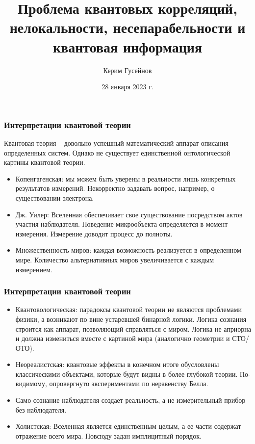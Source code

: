\documentclass[10pt]{beamer}
\title[Проблемы квантовой физики]{%
  Проблема квантовых корреляций, нелокальности, несепарабельности %
  и квантовая информация
}
\author{Керим Гусейнов}
\institute[МГУ]{Московский государственный университет имени М.\,В.~Ломоносова}
\date{28 января 2023 г.}
\begin{document}
\frame[plain]{\titlepage}

\begin{frame}[label=interpretations-1]%
  \frametitle{Интерпретации квантовой теории}

  Квантовая теория -- довольно успешный математический аппарат описания 
  определенных систем. Однако не существует единственной онтологической 
  картины квантовой теории.

  \begin{itemize}
    \item Копенгагенская: мы можем быть уверены в реальности лишь 
      конкретных результатов измерений. Некорректно задавать вопрос, 
      например, о существовании электрона.

    \item Дж. Уилер: Вселенная обеспечивает свое существование 
      посредством актов участия наблюдателя. Поведение микрообъекта 
      определяется в момент измерения. Измерение доводит процесс до 
      полноты.

    \item Множественность миров: каждая возможность реализуется 
      в определенном мире. Количество альтернативных миров увеличивается 
      с каждым измерением.
  \end{itemize}
\end{frame}%

\begin{frame}[label=interpretations-2]%
  \frametitle{Интерпретации квантовой теории}

  \begin{itemize}
    \item Квантовологическая: парадоксы квантовой теории не являются 
      проблемами физики, а возникают по вине устаревшей бинарной логики. 
      Логика сознания строится как аппарат, позволяющий справляться 
      с миром. Логика не априорна и должна измениться вместе с картиной 
      мира (аналогично геометрии и СТО/ОТО).

    \item Неореалистская: квантовые эффекты в конечном итоге обусловлены 
      классическими объектами, которые будут видны в более глубокой 
      теории. По-видимому, опровергнуто экспериментами по неравенству 
      Белла.

    \item Само сознание наблюдателя создает реальность, а не 
      измерительный прибор без наблюдателя.

    \item Холистская: Вселенная является единственным целым, а ее части 
      содержат отражение всего мира. Повсюду задан имплицитный порядок.
  \end{itemize}
\end{frame}%
\end{document}
